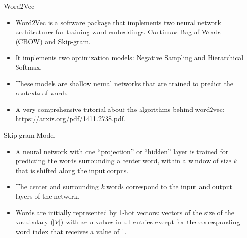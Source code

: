 \documentclass[handout]{beamer}
\begin{document}
\begin{frame}{Word2Vec}
\begin{scriptsize}
\begin{itemize}
\item Word2Vec is a software package that implements two neural network architectures for training word embeddings:  Continuos Bag of Words (CBOW) and Skip-gram.
\item It implements two  optimization models: Negative Sampling and Hierarchical Softmax.
\item These models are shallow neural networks that are trained to predict the contexts of words.

\item A very comprehensive tutorial about the algorithms behind word2vec: \url{https://arxiv.org/pdf/1411.2738.pdf}.

\end{itemize}
\end{scriptsize}
\end{frame}



\begin{frame}{Skip-gram Model}
\begin{scriptsize}
\begin{itemize}
\item A neural network with one ``projection'' or ``hidden'' layer is trained for predicting the words surrounding a center word, within a window  of size $k$ that is shifted along the input corpus. 
\item The center and surrounding $k$ words correspond to the input and output layers of the network.
\item Words are initially represented by 1-hot vectors: vectors of the size of the vocabulary ($|V|$) with zero values in all entries except for the corresponding word index that receives a value of 1. 
\end{itemize}
\end{scriptsize}

\end{frame}
\end{document}
